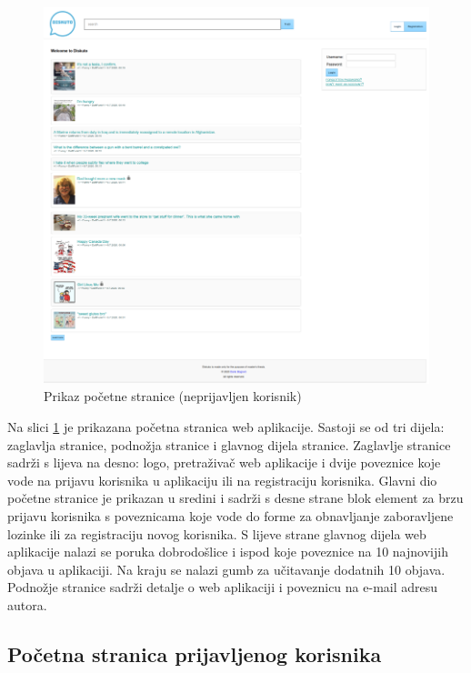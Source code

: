 \documentclass{foi}
\begin{document}
\begin{figure}[h!]
    \centering
    \includegraphics[width=1\textwidth]{slike/pocetna.png}
    \caption{Prikaz početne stranice (neprijavljen korisnik)}
    \label{pocetna}
\end{figure}

Na slici \ref{pocetna} je prikazana početna stranica web aplikacije. Sastoji se od tri dijela: zaglavlja stranice, podnožja stranice i glavnog dijela stranice. Zaglavlje stranice sadrži s lijeva na desno: logo, pretraživač web aplikacije i dvije poveznice koje vode na prijavu korisnika u aplikaciju ili na registraciju korisnika. Glavni dio početne stranice je prikazan u sredini i sadrži s desne strane blok element za brzu prijavu korisnika s poveznicama koje vode do forme za obnavljanje zaboravljene lozinke ili za registraciju novog korisnika. S lijeve strane glavnog dijela web aplikacije nalazi se poruka dobrodošlice i ispod koje poveznice na 10 najnovijih objava u aplikaciji. Na kraju se nalazi gumb za učitavanje dodatnih 10 objava. Podnožje stranice sadrži detalje o web aplikaciji i poveznicu na e-mail adresu autora.

\subsection{Početna stranica prijavljenog korisnika}
\end{document}
